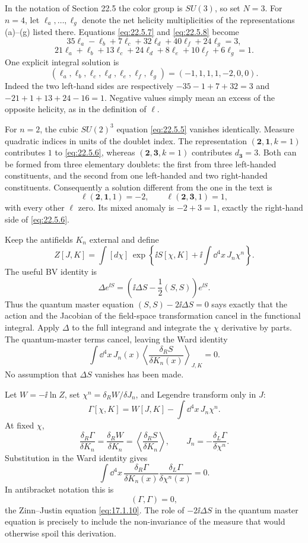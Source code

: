 \begin{enumerate}
  In the notation of Section 22.5 the color group is \(SU(3)\), so set
  \(N=3\).  For \(n=4\), let
  \(\ell_a,\ldots,\ell_g\) denote the net helicity multiplicities of the
  representations (a)--(g) listed there.  Equations
  \eqref{eq:22.5.7} and \eqref{eq:22.5.8} become
  \[
    35\ell_a-\ell_b+7\ell_c+32\ell_d
      +40\ell_f+24\ell_g=3,
  \]
  \[
    21\ell_a+\ell_b+13\ell_c+24\ell_d
      +8\ell_e+10\ell_f+6\ell_g=1.
  \]
  One explicit integral solution is
  \[
    \boxed{(\ell_a,\ell_b,\ell_c,\ell_d,\ell_e,\ell_f,\ell_g)
      =(-1,1,1,1,-2,0,0).}
  \]
  Indeed the two left-hand sides are respectively
  \(-35-1+7+32=3\) and
  \(-21+1+13+24-16=1\).  Negative values simply mean an excess of the
  opposite helicity, as in the definition of \(\ell\).

  For \(n=2\), the cubic \(SU(2)^3\) equation
  \eqref{eq:22.5.5} vanishes identically.  Measure quadratic indices in
  units of the doublet index.  The representation
  \((\mathbf2,\mathbf{1},k=1)\) contributes \(1\) to
  \eqref{eq:22.5.6}, whereas
  \((\mathbf2,\mathbf3,k=1)\) contributes
  \(d_{\mathbf3}=3\).  Both can be formed from three elementary
  doublets: the first from three left-handed constituents, and the
  second from one left-handed and two right-handed constituents.
  Consequently a solution different from the one in the text is
  \[
    \boxed{\ell(\mathbf2,\mathbf{1},1)=-2,\qquad
      \ell(\mathbf2,\mathbf3,1)=1,}
  \]
  with every other \(\ell\) zero.  Its mixed anomaly is
  \(-2+3=1\), exactly the right-hand side of
  \eqref{eq:22.5.6}.

  Keep the antifields \(K_n\) external and define
  \[
    Z[J,K]=\int[d\chi]\,
      \exp\left\{\ii S[\chi,K]+\ii\int \dd^4x\,J_n\chi^n\right\}.
  \]
  The useful BV identity is
  \[
    \Delta e^{\ii S}
      =\left(\ii\Delta S-\frac12(S,S)\right)e^{\ii S}.
  \]
  Thus the quantum master equation
  \((S,S)-2\ii\Delta S=0\) says exactly that the action and the
  Jacobian of the field-space transformation cancel in the functional
  integral.  Apply \(\Delta\) to the full integrand and integrate the
  \(\chi\) derivative by parts.  The quantum-master terms cancel,
  leaving the Ward identity
  \[
    \int \dd^4x\,J_n(x)
      \left\langle
        \frac{\delta_R S}{\delta K_n(x)}
      \right\rangle_{J,K}=0.
  \]
  No assumption that \(\Delta S\) vanishes has been made.

  Let \(W=-\ii\ln Z\), set
  \(\chi^n=\delta_R W/\delta J_n\), and Legendre transform only in
  \(J\):
  \[
    \Gamma[\chi,K]=W[J,K]-\int \dd^4x\,J_n\chi^n.
  \]
  At fixed \(\chi\),
  \[
    \frac{\delta_R\Gamma}{\delta K_n}
      =\frac{\delta_R W}{\delta K_n}
      =\left\langle\frac{\delta_R S}{\delta K_n}\right\rangle,
    \qquad
    J_n=-\frac{\delta_L\Gamma}{\delta\chi^n}.
  \]
  Substitution in the Ward identity gives
  \[
    \int \dd^4x\,
      \frac{\delta_R\Gamma}{\delta K_n(x)}
      \frac{\delta_L\Gamma}{\delta\chi^n(x)}=0.
  \]
  In antibracket notation this is
  \[
    \boxed{(\Gamma,\Gamma)=0,}
  \]
  the Zinn--Justin equation \eqref{eq:17.1.10}.  The role of
  \(-2\ii\Delta S\) in the quantum master equation is precisely to include
  the non-invariance of the measure that would otherwise spoil this
  derivation.
\end{enumerate}

